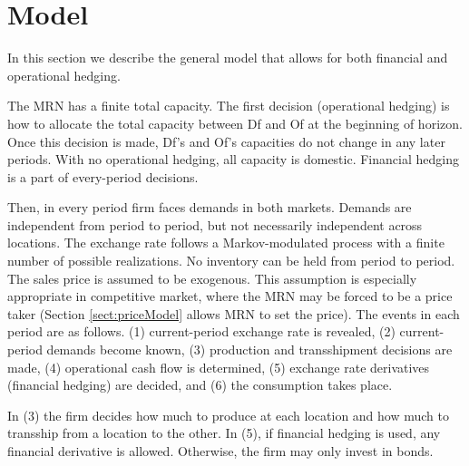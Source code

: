 \documentclass[mnsc,nonblindrev,copyedit]{informs2_wz} %
\newcommand{\OUT}[1]{}
\begin{document}
\section{Model \label{sect:basicModel}}

In this section we describe the general model that allows for both financial and operational hedging.  \OUT{*** OMIT??? Recall that operational hedging is defined as allocating a certain portion of the initial capacity to the foreign market (otherwise, with no operational hedging, all capacity is domestic).  The financial hedging is defined as use of any exchange-rate derivative (as opposed to use of bonds only).  The special cases of this general model will include the basic model, where neither operational nor financial hedging is allowed, and models with only one type of hedging. <- SHOULD WE SKIP THIS ****}

The MRN has a finite total capacity. 
The first decision (operational hedging) is how to allocate the total capacity between Df and Of at the beginning of horizon.  Once this decision is made, Df's and Of's capacities do not change in any later periods.  With no operational hedging, all capacity is domestic.
Financial hedging is a part of every-period decisions.

Then, in every period firm faces demands in both markets.  Demands are independent from period to period, but not necessarily independent across locations.  The exchange rate follows a Markov-modulated process with a finite number of possible realizations.  No inventory can be held from period to period.  The sales price is assumed to be exogenous.  This assumption is especially appropriate in competitive market, where the MRN may be forced to be a price taker (Section \ref{sect:priceModel} allows MRN to set the price).
The events in each period are as follows. (1) current-period exchange rate is revealed, (2) current-period demands become known, (3) production and transshipment decisions are made, (4) operational cash flow is determined, (5) exchange rate derivatives (financial hedging) are decided, and (6) the consumption takes place.

In (3) the firm decides how much to produce at each location and how much to transship from a location to the other. In (5), if financial hedging is used, any financial derivative is allowed.  Otherwise, the firm may only invest in bonds.

 
\end{document}
